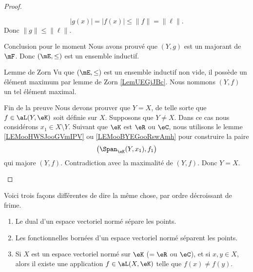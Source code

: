 \begin{proof}
\begin{subproof}
\begin{subproof}
            \begin{equation}
                | g(x) |=| f(x) |\leq\| f \|=\| \ell \|.
            \end{equation}
            Donc \( \| g \|\leq \| \ell \|\).
        \item[Conclusion pour le moment]
            Nous avons prouvé que \( (Y,g)\) est un majorant de \( \mF\). Donc \( (\mE,\leq)\) est un ensemble inductif.
            \end{subproof}
        \item[Lemme de Zorn]
            Vu que \( (\mE,\leq)\) est un ensemble inductif non vide, il possède un élément maximum par lemme de Zorn \ref{LemUEGjJBc}. Nous nommons \( (Y,f)\) un tel élément maximal.
        \item[Fin de la preuve]
            Nous devons prouver que \( Y=X\), de telle sorte que \( f\in\aL(Y,\eK)\) soit définie sur \( X\). Supposons que \( Y\neq X\). Dans ce cas nous considérons \( x_1\in X\setminus Y\). Suivant que \( \eK\) est \( \eR\) ou \( \eC\), nous utilisons le lemme \ref{LEMooHWSJooGVmIPV} ou \ref{LEMooBYEGooRswAmh} pour construire la paire
            \begin{equation}
                \big( \Span_{\eK}(Y,x_1),f_1 \big)
            \end{equation}
            qui majore \( (Y,f)\). Contradiction avec la maximalité de \( (Y,f)\). Donc \( Y=X\).
    \end{subproof}
\end{proof}

\begin{corollary}        \label{CORooOBDHooJpiBrs}
    Voici trois façons différentes de dire la même chose, par ordre décroissant de frime.
    \begin{enumerate}
        \item
            Le dual d'un espace vectoriel normé sépare les points.
        \item
            Les fonctionnelles bornées d'un espace vectoriel normé séparent les points.
        \item
            Si \( X\) est un espace vectoriel normé sur \( \eK\) (\( =\eR\) ou \( \eC\)), et si \( x,y\in X\), alors il existe une application \( f\in\aL(X,\eK)\) telle que \( f(x)\neq f(y)\).
    \end{enumerate}
\end{corollary}

